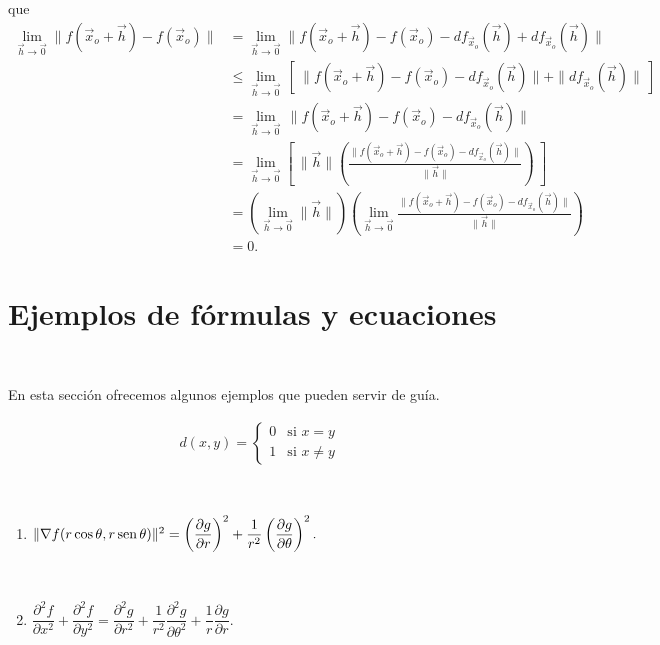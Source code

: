 que
\begin{align*}
\lim_{\vec{h} \rightarrow\vec{0}} \| f(\vec{x}_o +\vec{h}) - f(\vec{x}_o) \|& = \lim_{\vec{h}
\rightarrow\vec{0}} \| f(\vec{x}_o +\vec{h}) - f(\vec{x}_o) - df_{\vec{x}_o}(\vec{h}) +
df_{\vec{x}_o}(\vec{h}) \|\\
& \leq  \lim_{\vec{h} \rightarrow\vec{0}}\,\left[ \:\| f(\vec{x}_o +\vec{h}) - f(\vec{x}_o) -
df_{\vec{x}_o}(\vec{h}) \| + \| df_{\vec{x}_o}(\vec{h}) \|\: \right]\\
& =  \lim_{\vec{h} \rightarrow\vec{0}}\,\| f(\vec{x}_o +\vec{h}) - f(\vec{x}_o) -
df_{\vec{x}_o}(\vec{h}) \|  \\
& = \lim_{\vec{h} \rightarrow\vec{0}}\left[ \: \| \vec{h}\|\left( \frac{\| f(\vec{x}_o
+\vec{h}) - f(\vec{x}_o) - df_{\vec{x}_o}(\vec{h})\| }{\| \vec{h}\| }
 \right)   \:\right]\\
& = \left( \lim_{\vec{h} \rightarrow\vec{0}}   \| \vec{h}\|\right) \left( \lim_{\vec{h}
\rightarrow\vec{0}} \frac{\| f(\vec{x}_o +\vec{h}) - f(\vec{x}_o) -
df_{\vec{x}_o}(\vec{h})\|}{\| \vec{h}\| }  \right)\\
 & = 0.
\end{align*}

\newpage

\section{Ejemplos de f\'ormulas y ecuaciones}

\

En esta secci\'on ofrecemos algunos ejemplos que pueden servir de gu\'ia.

\begin{align*}
d(x, y) =
\begin{cases}
0 &   \text{si $x = y$} \\
1 &   \text{si $x \ne y$}
\end{cases}
\end{align*}

\

\begin{enumerate}
\item $\| \nabla f (r \cos \theta, r \operatorname{sen} \theta) \|^2 = \left( \dfrac{\partial g}{\partial
r} \right)^2 + \dfrac{1}{r^2} \left( \dfrac{\partial g}{\partial \theta} \right)^2.$

\

\item $\dfrac{\partial^2 f }{\partial x^2} + \dfrac{\partial^2 f }{\partial y^2} =
\dfrac{\partial^2 g }{\partial r^2} + \dfrac{1}{r^2} \dfrac{\partial^2 g }{\partial \theta^2}
+ \dfrac{1}{r} \dfrac{\partial g }{\partial r}.$
\end{enumerate}

